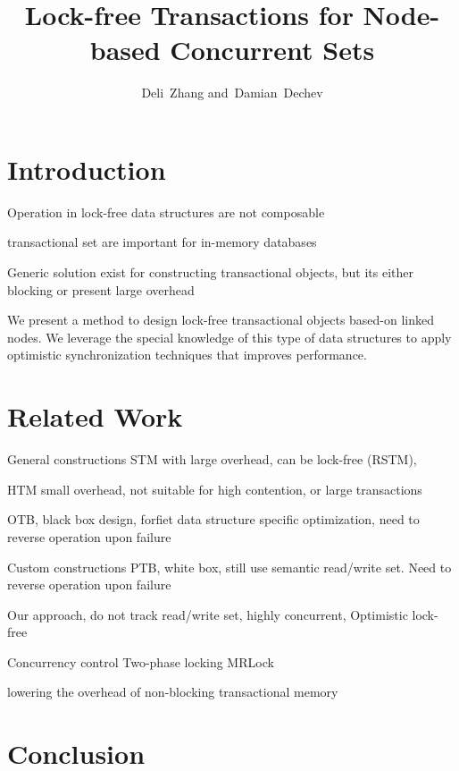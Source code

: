 \documentclass[10pt,journal,letter,compsoc]{IEEEtran}
\begin{document}
\title{Lock-free Transactions for Node-based Concurrent Sets}

\author{Deli~Zhang and~Damian~Dechev%
}

\maketitle

\section{Introduction}
Operation in lock-free data structures are not composable

transactional set are important for in-memory databases

Generic solution exist for constructing transactional objects, but its either blocking or present large overhead

We present a method to design lock-free transactional objects based-on linked nodes.
We leverage the special knowledge of this type of data structures to apply optimistic synchronization techniques that improves performance. 


\section{Related Work}
\label{sec:related}

General constructions
STM with large overhead, can be lock-free (RSTM), 

HTM small overhead, not suitable for high contention, or large transactions

OTB, black box design, forfiet data structure specific optimization, need to reverse operation upon failure

Custom constructions
PTB, white box, still use semantic read/write set. Need to reverse operation upon failure

Our approach, do not track read/write set, highly concurrent, Optimistic lock-free

Concurrency control
    Two-phase locking
    MRLock

lowering the overhead of non-blocking transactional memory
\section{Conclusion}
\label{sec:conclusion}


\end{document}
